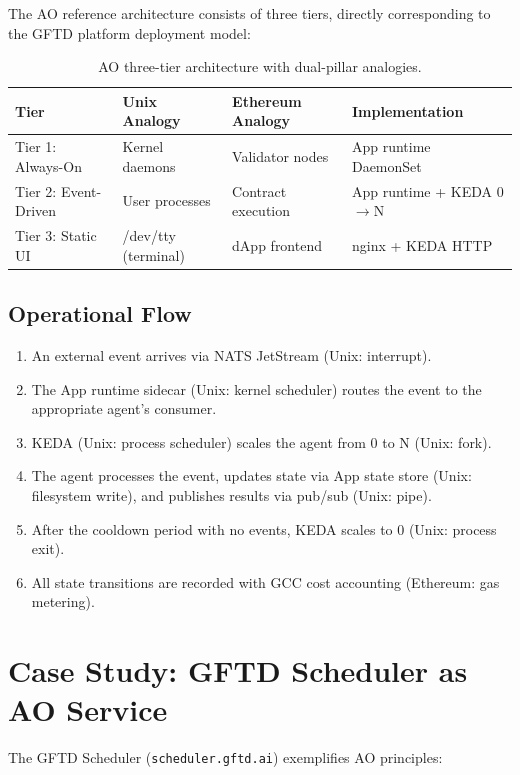 \documentclass[11pt,a4paper]{article}
\begin{document}
The AO reference architecture consists of three tiers, directly
corresponding to the GFTD platform deployment model:

\begin{table}[h]
\centering
\begin{tabular}{@{}llll@{}}
\toprule
\textbf{Tier} & \textbf{Unix Analogy} & \textbf{Ethereum Analogy} & \textbf{Implementation} \\
\midrule
Tier 1: Always-On & Kernel daemons & Validator nodes & App runtime DaemonSet \\
Tier 2: Event-Driven & User processes & Contract execution & App runtime + KEDA 0$\rightarrow$N \\
Tier 3: Static UI & /dev/tty (terminal) & dApp frontend & nginx + KEDA HTTP \\
\bottomrule
\end{tabular}
\caption{AO three-tier architecture with dual-pillar analogies.}
\end{table}

\subsection{Operational Flow}

\begin{enumerate}[nosep]
  \item An external event arrives via NATS JetStream (Unix: interrupt).
  \item The App runtime sidecar (Unix: kernel scheduler) routes the event to
    the appropriate agent's consumer.
  \item KEDA (Unix: process scheduler) scales the agent from 0 to N
    (Unix: fork).
  \item The agent processes the event, updates state via App state store
    (Unix: filesystem write), and publishes results via pub/sub
    (Unix: pipe).
  \item After the cooldown period with no events, KEDA scales to 0
    (Unix: process exit).
  \item All state transitions are recorded with GCC cost accounting
    (Ethereum: gas metering).
\end{enumerate}

\section{Case Study: GFTD Scheduler as AO Service}

The GFTD Scheduler (\texttt{scheduler.gftd.ai}) exemplifies AO principles:
\end{document}
